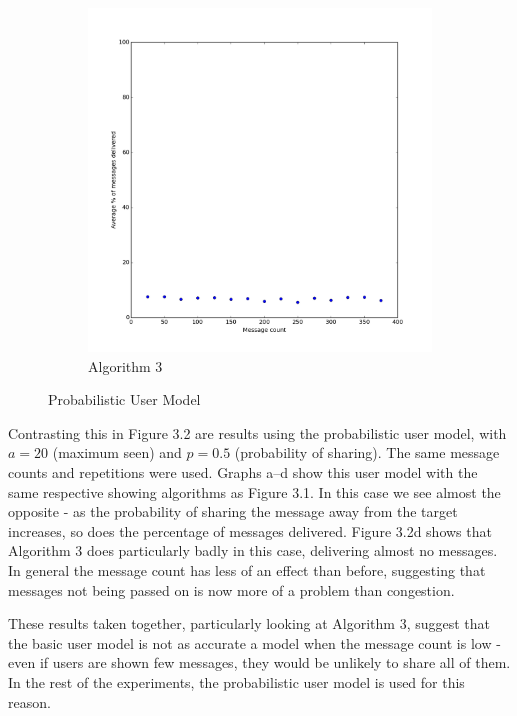 \documentclass[bsc,frontabs,twoside,singlespacing,parskip,deptreport]{infthesis}     %
\begin{document}
\begin{figure}
\begin{subfigure}[b]{0.3\textwidth}
        \includegraphics[width=\textwidth]{results/Prob50Share_OnlyBest}
        \caption{Algorithm 3}
        \label{fig:results/Prob50Share_OnlyBest}
    \end{subfigure}
  	\vspace{-5pt}
    \caption{Probabilistic User Model}\label{fig:Prob50UserModel}
  	\vspace{-15pt}
\end{figure}

Contrasting this in Figure 3.2 are results using the probabilistic user model, with $a = 20$ (maximum seen) and $p = 0.5$ (probability of sharing). The same message counts and repetitions were used. Graphs a--d show this user model with the same respective showing algorithms as Figure 3.1. In this case we see almost the opposite - as the probability of sharing the message away from the target increases, so does the percentage of messages delivered. Figure 3.2d shows that Algorithm 3 does particularly badly in this case, delivering almost no messages. In general the message count has less of an effect than before, suggesting that messages not being passed on is now more of a problem than congestion.

These results taken together, particularly looking at Algorithm 3, suggest that the basic user model is not as accurate a model when the message count is low - even if users are shown few messages, they would be unlikely to share all of them. In the rest of the experiments, the probabilistic user model is used for this reason.
\end{document}
